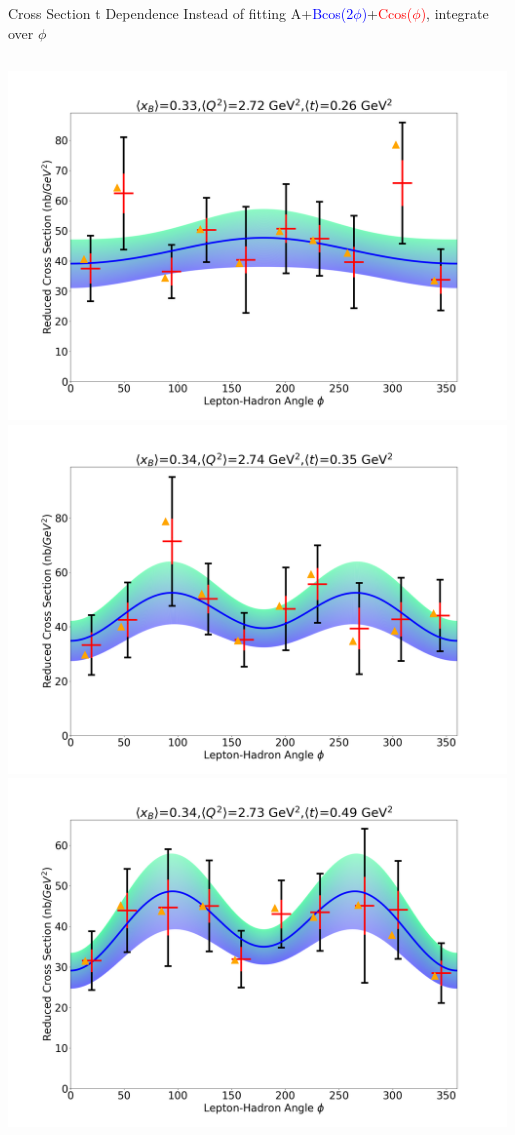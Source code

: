 \documentclass[aspectratio=169]{beamer}
\begin{document}
\begin{frame}{Cross Section t Dependence}
\vspace{-0.2cm}
Instead of fitting A+\textcolor{blue}{Bcos(2$\phi$)}+\textcolor{red}{Ccos($\phi$)}, integrate over $\phi$
\vspace{0.2cm}
\begin{columns}
            \includegraphics[width=0.99\textwidth]{defense/phi_fitting/xqt_302520.png}
            \includegraphics[width=0.99\textwidth]{defense/phi_fitting/xqt_302530.png}
            \includegraphics[width=0.99\textwidth]{defense/phi_fitting/xqt_302540.png}

\end{columns}
\end{frame}
\end{document}
